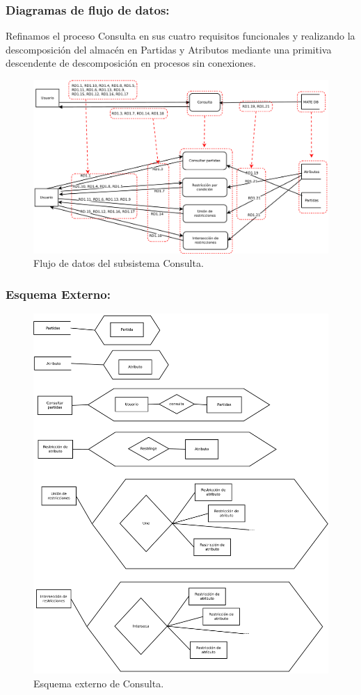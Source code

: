 \subsubsection{Diagramas de flujo de datos:}

Refinamos el proceso Consulta en sus cuatro requisitos funcionales  y realizando la descomposición del almacén en Partidas y Atributos mediante una primitiva descendente de descomposición en procesos sin conexiones.
 
\begin{figure}[h!]
\centering
\includegraphics[width=0.7\linewidth]{../Diagramas/pdf/RefinamientoConsulta.pdf}
\caption{Flujo de datos del subsistema Consulta.}

\label{fig:RefinamientoConsulta}
\end{figure}

\subsubsection{Esquema Externo:}

\begin{figure}[h!]
	\centering
	\includegraphics[width=0.7\linewidth]{../Diagramas/pdf/EsquemaExternoConsulta.pdf}
	\caption{Esquema externo de Consulta.}
	
	\label{fig:EsquemaExtConsulta}
\end{figure}

